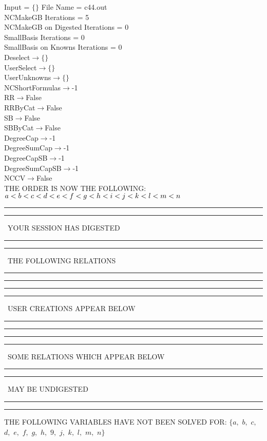 \documentclass[rep10,leqno]{report}
\begin{document}
\normalsize
\baselineskip=12pt
\noindent
Input = 
$
\{\}
$
File Name = c44.out\\
NCMakeGB Iterations = 5\\
NCMakeGB on Digested Iterations = 0\\
SmallBasis Iterations = 0\\
SmallBasis on Knowns Iterations = 0\\
Deselect$\rightarrow \{\}$\\
UserSelect$\rightarrow \{\}$\\
UserUnknowns$\rightarrow \{\}$\\
NCShortFormulas$\rightarrow$-1\\
RR$\rightarrow $False\\
RRByCat$\rightarrow $False\\
SB$\rightarrow $False\\
SBByCat$\rightarrow $False\\
DegreeCap$\rightarrow $-1\\
DegreeSumCap$\rightarrow $-1\\
DegreeCapSB$\rightarrow $-1\\
DegreeSumCapSB$\rightarrow $-1\\
NCCV$\rightarrow $False\\
THE ORDER IS NOW THE FOLLOWING:\hfil\break
$
a<b<c<d<e<f<g<h<i<j<k<l<m<n\\
$
\rule[2pt]{6in}{4pt}\hfil\break
\rule[2pt]{1.879in}{4pt}
\ YOUR SESSION HAS DIGESTED\ 
\rule[2pt]{1.879in}{4pt}\hfil\break
\rule[2pt]{1.923in}{4pt}
\ THE FOLLOWING RELATIONS\ 
\rule[2pt]{1.923in}{4pt}\hfil\break
\rule[2pt]{6in}{4pt}\hfil\break
\rule[2pt]{6in}{1pt}\hfil\break
\rule[2.5pt]{1.701in}{1pt}
\ USER CREATIONS APPEAR BELOW\ 
\rule[2.5pt]{1.701in}{1pt}\hfil\break
\rule[2pt]{6in}{1pt}\hfil\break
\rule[2pt]{6in}{4pt}\hfil\break
\rule[2pt]{1.45in}{4pt}
\ SOME RELATIONS WHICH APPEAR BELOW\ 
\rule[2pt]{1.45in}{4pt}\hfil\break
\rule[2pt]{2.18in}{4pt}
\ MAY BE UNDIGESTED\ 
\rule[2pt]{2.18in}{4pt}\hfil\break
\rule[2pt]{6in}{4pt}\hfil\break
THE FOLLOWING VARIABLES HAVE NOT BEEN SOLVED FOR:\hfil\break
$\{a,
$ $
b,
$ $
c,
$ $
d,
$ $
e,
$ $
f,
$ $
g,
$ $
h,
$ $
9,
$ $
j,
$ $
k,
$ $
l,
$ $
m,
$ $
n\}$
\smallskip\\
\vspace{10pt}
\end{document}
